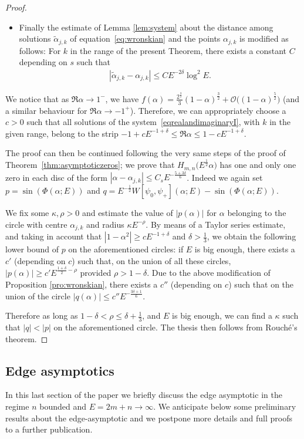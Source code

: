 \documentclass[pdftex]{sigma}
\numberwithin{equation}{section}
\newcommand{\al}{\alpha}
\begin{document}
\begin{proof}
\begin{itemize}
			\item[(v)]Finally the estimate of Lemma \ref{lem:system} about the distance among solutions $\tilde{\al}_{j,k}$
			of equation~\eqref{eq:wronskian}
			and the points $\al_{j,k}$ is modif\/ied as follows: For $k$ in the range of the present Theorem,
			there exists a constant $C$
			depending on $s$ such that
	 \begin{gather*}
	 |\tilde{\al}_{j,k}- \al_{j,k}|\leq C E^{-2 \delta} \log^2 E .
	 \end{gather*}
		\end{itemize}
		We notice that as $\Re \al \to 1^- $, we have $f(\al)=\frac{2^{\frac32}}{3}(1-\al)^{\frac32}+\mathcal{O}\big((1-\al)^{\frac52}\big)$
		(and a similar behaviour for $\Re \al \to -1^+$). Therefore, we can appropriately choose a $c>0$ such that all solutions of the system~\eqref{eqrealandimaginaryI}, with $k$ in the given range, belong to the strip $ -1+cE^{-1+\delta}\leq \Re \alpha\leq 1-cE^{-1+\delta}$.
	
The proof can then be continued following the very same steps of the proof of Theorem~\ref{thm:asymptoticzeros}; we prove that $H_{m,n}\big(E^{\frac12}\al\big)$ has one and only one zero in each disc of the form $|\al-\al_{j,k}|\leq C_s E^{-\frac{5+3 \delta}6}$. Indeed we again set $p=\sin (\Phi(\al;E) ) $ and $q=E^{-\frac12} W[\psi_0,\psi_+](\al;E)-\sin (\Phi(\al;E) )$.
		
		We f\/ix some $\kappa,\rho>0$ and estimate the value of $|p(\al)|$ for $\al$ belonging to the circle with centre
		$\al_{j,k}$ and radius $\kappa E^{-\rho}$. By means of a Taylor series estimate,
		and taking in account that $|1-\al^2|\geq c E^{-1+\delta}$ and $\delta>\frac13$, we obtain the following lower bound of $p$
		on the aforementioned circles: if $E$ is big enough, there exists a
		$c'$ (depending on $c$) such that, on the union of all these circles,
		$|p(\al)|\geq c' E^{\frac{1+\delta}{2}-\rho}$ provided $\rho>1-\delta$.
		Due to the above modif\/ication of Proposition \ref{pro:wronskian}, there exists a $c''$ (depending on $c$) such that
		on the union of the circle $|q(\al)|\leq c'' E^{-\frac{3\delta+1}{6}} $.
		
		Therefore as long as $1-\delta<\rho\leq \delta+\frac13$, and $E$ is big enough, we can f\/ind
		a $\kappa$ such that $|q| < |p|$ on the aforementioned circle. The thesis then follows from Rouch\'e's theorem.
	\end{proof}
	
\subsection{Edge asymptotics}\label{sub:edge}
In this last section of the paper we brief\/ly discuss the edge asymptotic in the regime $n$ bounded and $E=2m+n \to \infty$.
We anticipate below some preliminary results about the edge-asymptotic and we postpone more details and full proofs to a further publication.
\end{document}
